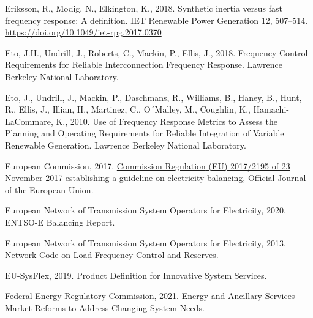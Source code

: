\documentclass[12pt,a4paper,]{report}
\newlength{\cslhangindent}
\newenvironment{CSLReferences}[2] %
 {%
  \setlength{\parindent}{0pt}
  \ifodd #1 \everypar{\setlength{\hangindent}{\cslhangindent}}\ignorespaces\fi
  \ifnum #2 > 0
  \setlength{\parskip}{#2\baselineskip}
  \fi
 }%
 {}
\begin{document}
\begin{CSLReferences}{1}{0}
\leavevmode{}%
Eriksson, R., Modig, N., Elkington, K., 2018. Synthetic inertia versus
fast frequency response: {A} definition. IET Renewable Power Generation
12, 507--514. \url{https://doi.org/10.1049/iet-rpg.2017.0370}

\leavevmode{}%
Eto, J.H., Undrill, J., Roberts, C., Mackin, P., Ellis, J., 2018.
Frequency {Control Requirements} for {Reliable Interconnection Frequency
Response}. {Lawrence Berkeley National Laboratory}.

\leavevmode{}%
Eto, J., Undrill, J., Mackin, P., Daschmans, R., Williams, B., Haney,
B., Hunt, R., Ellis, J., Illian, H., Martinez, C., O´Malley, M.,
Coughlin, K., Hamachi-LaCommare, K., 2010. Use of {Frequency Response
Metrics} to {Assess} the {Planning} and {Operating Requirements} for
{Reliable Integration} of {Variable Renewable Generation}. {Lawrence
Berkeley National Laboratory}.

\leavevmode{}%
European Commission, 2017.
\href{https://eur-lex.europa.eu/legal-content/EN/TXT/?uri=uriserv:OJ.L_.2017.312.01.0006.01.ENG&toc=OJ:L:2017:312:TOC\#d1e4442-6-1}{Commission
{Regulation} ({EU}) 2017/2195 of 23 {November} 2017 establishing a
guideline on electricity balancing}, Official Journal of the European
Union.

\leavevmode{}%
European Network of Transmission System Operators for Electricity, 2020.
{ENTSO-E Balancing Report}.

\leavevmode{}%
European Network of Transmission System Operators for Electricity, 2013.
Network {Code} on {Load-Frequency Control} and {Reserves}.

\leavevmode{}%
EU-SysFlex, 2019. Product {Definition} for {Innovative System Services}.

\leavevmode{}%
Federal Energy Regulatory Commission, 2021.
\href{https://www.ferc.gov/news-events/news/ferc-staff-issues-report-energy-and-ancillary-services-market-reforms-address}{Energy
and {Ancillary Services Market Reforms} to {Address Changing System
Needs}}.


\end{CSLReferences}
\end{document}
